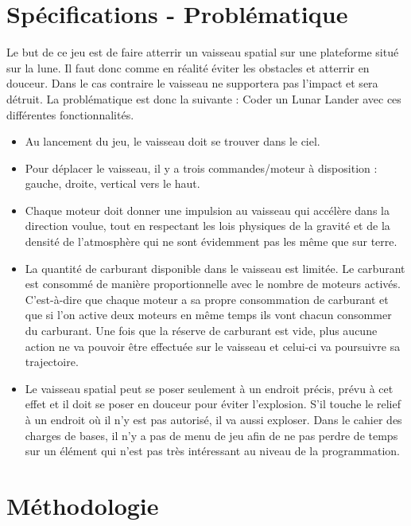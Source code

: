 \section{Spécifications - Problématique}
Le but de ce jeu est de faire atterrir un vaisseau spatial sur une plateforme situé sur la lune. Il faut donc comme en réalité éviter les obstacles et atterrir en douceur. Dans le cas contraire le vaisseau ne supportera pas l’impact et sera détruit.
La problématique est donc la suivante : Coder un Lunar Lander avec ces différentes fonctionnalités.
\begin{itemize}
Voici le cahier des charges qui nous a été transmis :
\item	Au lancement du jeu, le vaisseau doit se trouver dans le ciel.
\item	Pour déplacer le vaisseau, il y a trois commandes/moteur à disposition : gauche, droite, vertical vers le haut.
\item	Chaque moteur doit donner une impulsion au vaisseau qui accélère dans la direction voulue, tout en respectant les lois physiques de la gravité et de la densité de l’atmosphère qui ne sont évidemment pas les même que sur terre.
\item	La quantité de carburant disponible dans le vaisseau est limitée. Le carburant est consommé de manière proportionnelle avec le nombre de moteurs activés. C’est-à-dire que chaque moteur a sa propre consommation de carburant et que si l’on active deux moteurs en même temps ils vont chacun consommer du carburant. Une fois que la réserve de carburant est vide, plus aucune action ne va pouvoir être effectuée sur le vaisseau et celui-ci va poursuivre sa trajectoire.
\item	Le vaisseau spatial peut se poser seulement à un endroit précis, prévu à cet effet et il doit se poser en douceur pour éviter l’explosion. S’il touche le relief à un endroit où il n’y est pas autorisé, il va aussi exploser.
Dans le cahier des charges de bases, il n’y a pas de menu de jeu afin de ne pas perdre de temps sur un élément qui n’est pas très intéressant au niveau de la programmation.
\end{itemize}

\section{Méthodologie}
